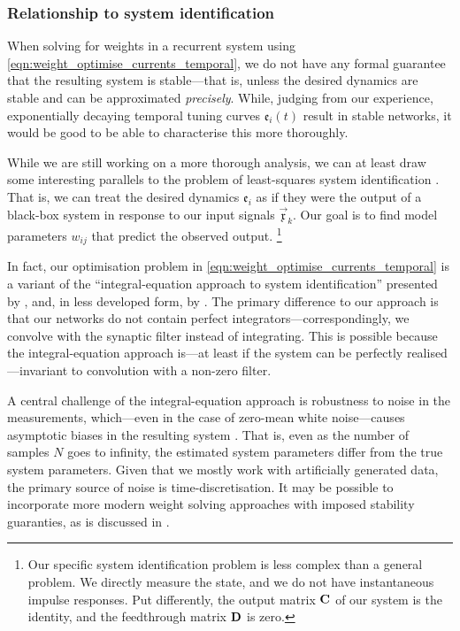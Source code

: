 \subsubsection{Relationship to system identification}
When solving for weights in a recurrent system using \cref{eqn:weight_optimise_currents_temporal}, we do not have any formal guarantee that the resulting system is stable---that is, unless the desired dynamics are stable and can be approximated \emph{precisely}.
While, judging from our experience, exponentially decaying temporal tuning curves $\mathfrak{e}_i(t)$ result in stable networks, it would be good to be able to characterise this more thoroughly.

While we are still working on a more thorough analysis, we can at least draw some interesting parallels to the problem of least-squares system identification \citep[cf.][specifically Chapters~7-10]{verhaegen2007filtering}.
That is, we can treat the desired dynamics $\mathfrak{e}_i$ as if they were the output of a black-box system in response to our input signals $\vec{\mathfrak{x}}_k$.
Our goal is to find model parameters $w_{ij}$ that predict the observed output.%
\footnote{Our specific system identification problem is less complex than a general problem.
We directly measure the state, and we do not have instantaneous impulse responses.
Put differently, the output matrix $\mathbf{C}$ of our \LTI system is the identity, and the feedthrough matrix $\mathbf{D}$ is zero.}

In fact, our optimisation problem in \cref{eqn:weight_optimise_currents_temporal} is a variant of the \enquote{integral-equation approach to system identification} presented by \citet{whitfield1987integralequation}, and, in less developed form, by \citet{squire1971simple}.
The primary difference to our approach is that our networks do not contain perfect integrators---correspondingly, we convolve with the synaptic filter instead of integrating.
This is possible because the integral-equation approach is---at least if the system can be perfectly realised---invariant to convolution with a non-zero filter.

A central challenge of the integral-equation approach is robustness to noise in the measurements, which---even in the case of zero-mean white noise---causes asymptotic biases in the resulting system \citep{sagara1989recursive}.
That is, even as the number of samples $N$ goes to infinity, the estimated system parameters differ from the true system parameters.
Given that we mostly work with artificially generated data, the primary source of noise is time-discretisation.
It may be possible to incorporate more modern weight solving approaches with imposed stability guaranties, as is discussed in \citet{verhaegen2007filtering}.

